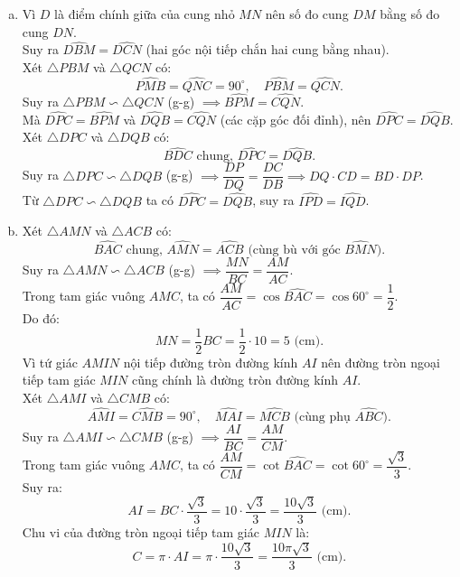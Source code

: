 \begin{bt}
{\begin{enumerate}[a)]
    Suy ra $AI \perp BC$.\\
    Tứ giác $AM I N$ có $\widehat{AM I} = \widehat{AN I} = 90^\circ$, nên $\widehat{AM I} + \widehat{AN I} = 180^\circ$.\\
    Do đó tứ giác $AM I N$ nội tiếp đường tròn đường kính $AI$.
    \item Vì $D$ là điểm chính giữa của cung nhỏ $MN$ nên số đo cung $DM$ bằng số đo cung $DN$.\\
    Suy ra $\widehat{DBM} = \widehat{DCN}$ (hai góc nội tiếp chắn hai cung bằng nhau).\\
    Xét $\triangle PBM$ và $\triangle QCN$ có:
    $$\widehat{PMB} = \widehat{QNC} = 90^\circ, \quad \widehat{PBM} = \widehat{QCN}.$$
    Suy ra $\triangle PBM \backsim \triangle QCN$ (g-g) $\implies \widehat{BPM} = \widehat{CQN}$.\\
    Mà $\widehat{DPC} = \widehat{BPM}$ và $\widehat{DQB} = \widehat{CQN}$ (các cặp góc đối đỉnh), nên $\widehat{DPC} = \widehat{DQB}$.\\
    Xét $\triangle DPC$ và $\triangle DQB$ có:
    $$\widehat{BDC}\text{ chung, } \widehat{DPC} = \widehat{DQB}.$$
    Suy ra $\triangle DPC \backsim \triangle DQB$ (g-g) $\implies \dfrac{DP}{DQ} = \dfrac{DC}{DB} \implies DQ \cdot CD = BD \cdot DP$.\\
    Từ $\triangle DPC \backsim \triangle DQB$ ta có $\widehat{DPC} = \widehat{DQB}$, suy ra $\widehat{IPD} = \widehat{IQD}$.
    \item Xét $\triangle AMN$ và $\triangle ACB$ có:
    $$\widehat{BAC}\text{ chung, } \widehat{AMN} = \widehat{ACB}\text{ (cùng bù với góc } \widehat{BMN}\text{)}.$$
    Suy ra $\triangle AMN \backsim \triangle ACB$ (g-g) $\implies \dfrac{MN}{BC} = \dfrac{AM}{AC}$.\\
    Trong tam giác vuông $AMC$, ta có $\dfrac{AM}{AC} = \cos \widehat{BAC} = \cos 60^\circ = \dfrac{1}{2}$.\\
    Do đó:
    $$MN = \dfrac{1}{2}BC = \dfrac{1}{2} \cdot 10 = 5\text{ (cm)}.$$
    Vì tứ giác $AM I N$ nội tiếp đường tròn đường kính $AI$ nên đường tròn ngoại tiếp tam giác $MIN$ cũng chính là đường tròn đường kính $AI$.\\
    Xét $\triangle AMI$ và $\triangle CMB$ có:
    $$\widehat{AMI} = \widehat{CMB} = 90^\circ, \quad \widehat{MAI} = \widehat{MCB}\text{ (cùng phụ } \widehat{ABC}\text{)}.$$
    Suy ra $\triangle AMI \backsim \triangle CMB$ (g-g) $\implies \dfrac{AI}{BC} = \dfrac{AM}{CM}$.\\
    Trong tam giác vuông $AMC$, ta có $\dfrac{AM}{CM} = \cot \widehat{BAC} = \cot 60^\circ = \dfrac{\sqrt{3}}{3}$.\\
    Suy ra:
    $$AI = BC \cdot \dfrac{\sqrt{3}}{3} = 10 \cdot \dfrac{\sqrt{3}}{3} = \dfrac{10\sqrt{3}}{3}\text{ (cm)}.$$
    Chu vi của đường tròn ngoại tiếp tam giác $MIN$ là:
    $$C = \pi \cdot AI = \pi \cdot \dfrac{10\sqrt{3}}{3} = \dfrac{10\pi\sqrt{3}}{3}\text{ (cm)}.$$
\end{enumerate}
}
\end{bt}

